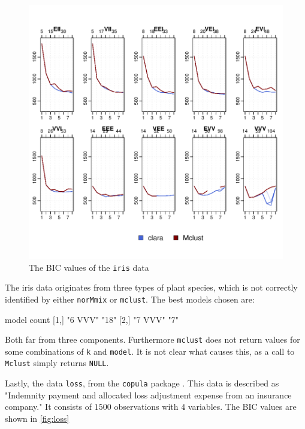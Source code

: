 \begin{figure}[h!]
    \begin{Rgraph}[0.9]
\includegraphics{chapter3-figtriris}
    \caption{The BIC values of the {\tt iris} data}
    \label{fig:triris}
    \end{Rgraph}
\end{figure}

The iris data originates from three types of plant species, which is not 
correctly identified by either {\tt norMmix} or {\tt mclust}. The best models
chosen are:

\begin{Schunk}
\begin{Soutput}
     model   count
[1,] "6 VVV" "18" 
[2,] "7 VVV" "7"  
\end{Soutput}
\end{Schunk}

Both far from three components. Furthermore {\tt mclust} does not return values
for some combinations of {\tt k} and {\tt model}. It is not clear what causes 
this, as a call to {\tt Mclust} simply returns {\tt NULL}.

Lastly, the data {\tt loss}, from the {\tt copula} package \cite{cop18}. This 
data is described as "Indemnity payment and allocated loss adjustment expense 
from an insurance company." It consists of $1500$ observations with $4$ 
variables. The BIC values are shown in \ref{fig:loss}

